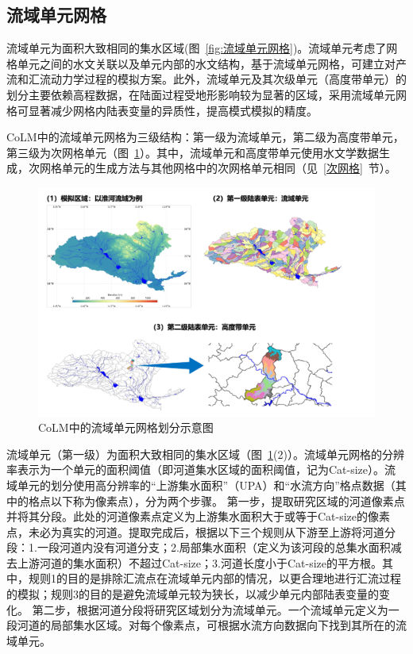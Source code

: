 \subsection{流域单元网格}\label{流域单元网格}
流域单元为面积大致相同的集水区域(图~\ref{fig:流域单元网格})。流域单元考虑了网格单元之间的水文关联以及单元内部的水文结构，基于流域单元网格，可建立对产流和汇流动力学过程的模拟方案。此外，流域单元及其次级单元（高度带单元）的划分主要依赖高程数据，在陆面过程受地形影响较为显著的区域，采用流域单元网格可显著减少网格内陆表变量的异质性，提高模式模拟的精度。

CoLM中的流域单元网格为三级结构：第一级为流域单元，第二级为高度带单元，第三级为次网格单元（图~\ref{fig:流域单元示意图}）。其中，流域单元和高度带单元使用水文学数据生成，次网格单元的生成方法与其他网格中的次网格单元相同（见~\ref{次网格}~节）。

{
\begin{figure}[htbp]
\centering
\includegraphics[width=\textwidth]{Figures/模式构架/流域单元示意图.jpg}
\caption{CoLM中的流域单元网格划分示意图}
\label{fig:流域单元示意图}
\end{figure}
}

流域单元（第一级）为面积大致相同的集水区域（图~\ref{fig:流域单元示意图}(2)）。流域单元网格的分辨率表示为一个单元的面积阈值（即河道集水区域的面积阈值，记为Cat-size）。流域单元的划分使用高分辨率的“上游集水面积”（UPA）和“水流方向”格点数据（其中的格点以下称为像素点），分为两个步骤。
第一步，提取研究区域的河道像素点并将其分段。此处的河道像素点定义为上游集水面积大于或等于Cat-size的像素点，未必为真实的河道。提取完成后，根据以下三个规则从下游至上游将河道分段：1.一段河道内没有河道分支；2.局部集水面积（定义为该河段的总集水面积减去上游河道的集水面积）不超过Cat-size；3.河道长度小于Cat-size的平方根。其中，规则1的目的是排除汇流点在流域单元内部的情况，以更合理地进行汇流过程的模拟；规则3的目的是避免流域单元较为狭长，以减少单元内部陆表变量的变化。
第二步，根据河道分段将研究区域划分为流域单元。一个流域单元定义为一段河道的局部集水区域。对每个像素点，可根据水流方向数据向下找到其所在的流域单元。


